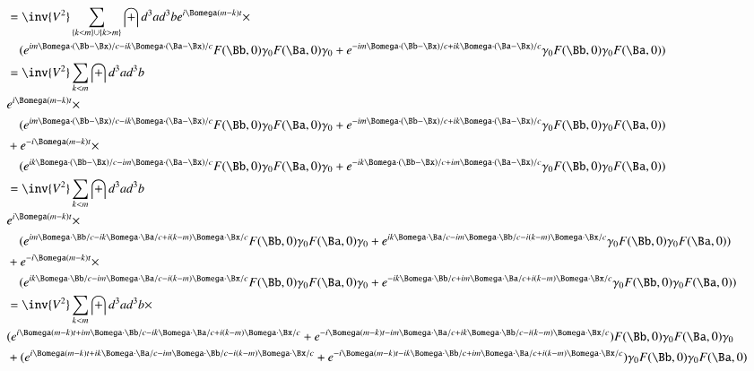 \documentclass{article}
\begin{document}
\begin{align*}
&=\inv{V^2} \sum_{\{k <m\} \cup \{ k > m \}} \int d^3 a d^3 b e^{i \Bomega (m -k) t } \times \\
&\quad (e^{   i m \Bomega \cdot (\Bb-\Bx)/c - i k \Bomega \cdot (\Ba-\Bx)/c } F(\Bb, 0) \gamma_0 F(\Ba, 0) \gamma_0  
+e^{ - i m \Bomega \cdot (\Bb-\Bx)/c + i k \Bomega \cdot (\Ba-\Bx)/c } \gamma_0 F(\Bb, 0) \gamma_0 F(\Ba, 0)) \\
&=\inv{V^2} \sum_{ k <m } \int d^3 a d^3 b \\
&e^{i \Bomega (m -k) t } \times \\
&\quad (e^{   i m \Bomega \cdot (\Bb-\Bx)/c - i k \Bomega \cdot (\Ba-\Bx)/c } F(\Bb, 0) \gamma_0 F(\Ba, 0) \gamma_0  
+e^{ - i m \Bomega \cdot (\Bb-\Bx)/c + i k \Bomega \cdot (\Ba-\Bx)/c } \gamma_0 F(\Bb, 0) \gamma_0 F(\Ba, 0)) \\
&+e^{-i \Bomega (m -k) t } \times \\
&\quad (e^{   i k \Bomega \cdot (\Bb-\Bx)/c - i m \Bomega \cdot (\Ba-\Bx)/c } F(\Bb, 0) \gamma_0 F(\Ba, 0) \gamma_0  
+e^{ - i k \Bomega \cdot (\Bb-\Bx)/c + i m \Bomega \cdot (\Ba-\Bx)/c } \gamma_0 F(\Bb, 0) \gamma_0 F(\Ba, 0)) \\
&=\inv{V^2} \sum_{ k <m } \int d^3 a d^3 b \\
&e^{i \Bomega (m -k) t } \times \\
&\quad (e^{   i m \Bomega \cdot \Bb/c - i k \Bomega \cdot \Ba/c + i (k-m) \Bomega \cdot \Bx/c } F(\Bb, 0) \gamma_0 F(\Ba, 0) \gamma_0  
+e^{ i k \Bomega \cdot \Ba/c - i m \Bomega \cdot \Bb/c - i (k -m) \Bomega \cdot \Bx/c } \gamma_0 F(\Bb, 0) \gamma_0 F(\Ba, 0)) \\
&+e^{-i \Bomega (m -k) t } \times \\
&\quad (e^{   i k \Bomega \cdot \Bb/c - i m \Bomega \cdot \Ba/c -i (k-m) \Bomega \cdot \Bx/c } F(\Bb, 0) \gamma_0 F(\Ba, 0) \gamma_0  
+e^{ - i k \Bomega \cdot \Bb/c + i m \Bomega \cdot \Ba/c + i (k-m) \Bomega \cdot \Bx/c } \gamma_0 F(\Bb, 0) \gamma_0 F(\Ba, 0)) \\
&=\inv{V^2} \sum_{ k <m } \int d^3 a d^3 b \times \\
&(e^{
  i \Bomega (m -k) t
+ i m \Bomega \cdot \Bb/c 
- i k \Bomega \cdot \Ba/c
+ i (k-m) \Bomega \cdot \Bx/c
}
+e^{
- i \Bomega (m -k) t
- i m \Bomega \cdot \Ba/c 
+ i k \Bomega \cdot \Bb/c 
- i (k-m) \Bomega \cdot \Bx/c
} 
)
F(\Bb, 0) \gamma_0 F(\Ba, 0) \gamma_0  \\
&+(e^{  
  i \Bomega (m -k) t 
+ i k \Bomega \cdot \Ba/c 
- i m \Bomega \cdot \Bb/c 
- i (k -m) \Bomega \cdot \Bx/c
} 
+e^{
- i \Bomega (m -k) t  
- i k \Bomega \cdot \Bb/c 
+ i m \Bomega \cdot \Ba/c 
+ i (k-m) \Bomega \cdot \Bx/c
} 
) \gamma_0 F(\Bb, 0) \gamma_0 F(\Ba, 0)  \\
\end{align*}
\end{document}
